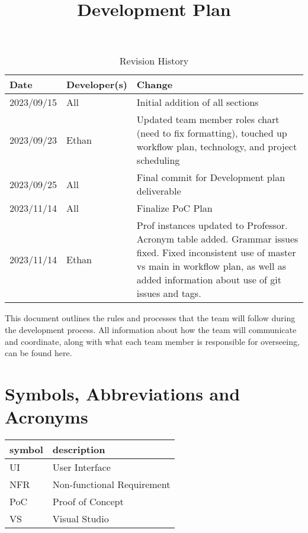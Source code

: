 \documentclass{article}
\title{Development Plan\\\progname}
\author{\authname}
\date{}
\begin{document}
\maketitle

\begin{table}[hp]
\caption{Revision History} \label{TblRevisionHistory}
\begin{tabularx}{\textwidth}{llX}
\toprule
\textbf{Date} & \textbf{Developer(s)} & \textbf{Change}\\
\midrule
2023/09/15 & All & Initial addition of all sections\\
2023/09/23 & Ethan & Updated team member roles chart (need to fix formatting), touched up workflow plan, technology, and project scheduling  \\
2023/09/25 & All & Final commit for Development plan deliverable\\
2023/11/14 & All & Finalize PoC Plan\\
2023/11/14 & Ethan & Prof instances updated to Professor. Acronym table added. Grammar issues fixed. Fixed inconsistent use of master vs main in workflow plan, as well as added information about use of git issues and tags. \\

\bottomrule
\end{tabularx}
\end{table}

This document outlines the rules and processes that the team will follow during the development process. All information about how the team will communicate and coordinate, along with what each team member is responsible for overseeing, can be found here.

\section{Symbols, Abbreviations and Acronyms}

\renewcommand{\arraystretch}{1.2}
\begin{tabular}{l l} 
  \toprule		
  \textbf{symbol} & \textbf{description}\\
  \midrule 
  UI & User Interface\\
  NFR & Non-functional Requirement \\
  PoC & Proof of Concept \\
  VS & Visual Studio\\
  \bottomrule
\end{tabular}\\
\end{document}
